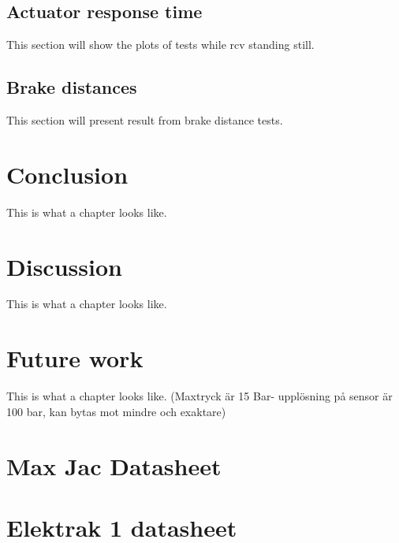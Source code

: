 \documentclass[a4paper,11pt]{kth-mag}
\begin{document}
\section{Actuator response time}
This section will show the plots of tests while \gls{rcv} standing still. 

\section{Brake distances}
This section will present result from brake distance tests. 




\chapter{Conclusion}
This is what a chapter looks like.

\chapter{Discussion}
This is what a chapter looks like.
\chapter{Future work}
This is what a chapter looks like.
(Maxtryck är 15 Bar- upplösning på sensor är 100 bar, kan bytas mot mindre och exaktare)



\glsaddall

\appendix
\addappheadtotoc
\chapter{Max Jac Datasheet}
\label{appendix:Max_Jac}

\chapter{Elektrak 1 datasheet}
\label{appendix:Electrak_1}

\end{document}
